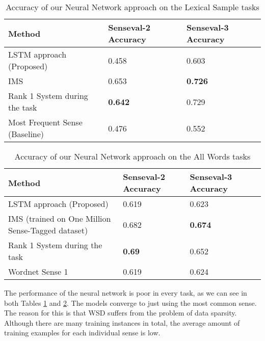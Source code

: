 \begin{table}
	\caption{Accuracy of our Neural Network approach on the Lexical Sample tasks}
	\label{table:NN-LS}
	\begin{center}
		\begin{tabular}{| p{6cm} | p{4cm} | p{4cm} |}
			\hline
			Method & Senseval-2 Accuracy & Senseval-3 Accuracy \\
			\hline
			LSTM approach (Proposed) & 0.458  & 0.603 \\
			
			\hline
			IMS & 0.653 & {\bf0.726}\\
			\hline
			Rank 1 System during the task & {\bf0.642} & 0.729 \\
			\hline
			Most Frequent Sense (Baseline) & 0.476 & 0.552 \\
			\hline
		\end{tabular}
	\end{center}
\end{table}

\begin{table}
	\caption{Accuracy of our Neural Network approach on the All Words tasks}
	\label{table:NN_AW}
	\begin{center}
		\begin{tabular}{| p{7cm} | p{2cm} | p{2cm} | p{2cm} | }
			\hline
			Method & Senseval-2 Accuracy & Senseval-3 Accuracy\\
			\hline
			LSTM approach (Proposed) & 0.619  & 0.623  \\
			
			\hline
			IMS (trained on One Million Sense-Tagged dataset) & 0.682 & {\bf0.674} \\
			\hline
			Rank 1 System during the task & {\bf0.69} & 0.652  \\
			\hline
			Wordnet Sense 1 & 0.619 & 0.624  \\
			\hline
		\end{tabular}
	\end{center}
\end{table}

The performance of the neural network is poor in every task, as we can see in both Tables \ref{table:NN-LS} and \ref{table:NN_AW}. The models converge to just using the most common sense. The reason for this is that WSD suffers from the problem of data sparsity. Although there are many training instances in total, the average amount of training examples for each individual sense is low. 
